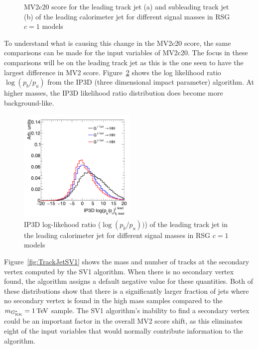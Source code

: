 \begin{figure}[h!]
   \caption{MV2c20 score for the leading track jet (a) and subleading track jet (b) of the leading calorimeter jet for different signal masses in RSG $c=1$ models}
  \label{fig:TrackJetMV2}
\end{figure}

To understand what is causing this change in the MV2c20 score, the same comparisons can be made for the input variables of MV2c20. The focus in these comparisons will be on the leading track jet as this is the one seen to have the largest difference in MV2 score. Figure~\ref{fig:TrackJetIP3D} shows the log likelihood ratio $\log(p_b/p_u)$ from the IP3D (three dimensional impact parameter) algorithm. At higher masses, the IP3D likelihood ratio distribution does become more background-like. 

\begin{figure}[h!]
  \centering
  \captionsetup{justification=centering}

  \includegraphics[width=0.5\textwidth]{figures/LeadTrackJet_IP3D}
  \caption{IP3D log-likehood ratio ($\log(p_b/p_u))$) of the leading track jet in the leading calorimeter jet for different signal masses in RSG $c=1$ models}
  \label{fig:TrackJetIP3D}
\end{figure}
%
Figure~\ref{fig:TrackJetSV1} shows the mass and number of tracks at the secondary vertex computed by the SV1 algorithm. When there is no secondary vertex found, the algorithm assigns a default negative value for these quantities. Both of these distributions show that there is a significantly larger fraction of jets where no secondary vertex is found in the high mass samples compared to the $m_{\Gkk} = 1 \TeV$ sample. The SV1 algorithm's inability to find a secondary vertex could be an important factor in the overall MV2 score shift, as this eliminates eight of the input variables that would normally contribute information to the algorithm. 

